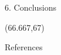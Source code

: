 \documentclass{beamer}
\begin{document}
\begin{frame}{}
\begin{columns}
\begin{column}{.3333\paperwidth}
\begin{textblock}{\textwidth \TPHorizModule}
\begin{block}{6. Conclusions}
\begin{shaded}
     \end{shaded}
     \vspace{-1cm}

    \end{block}
   \end{textblock}

   \begin{textblock}{\textwidth \TPHorizModule}(66.667,67)
    \begin{block}{References}
     \vspace{-1cm}
     \justifying
     

     \scriptsize %

    \end{block}
   \end{textblock}


  \end{column}
 \end{columns}
\end{frame}
\end{document}
